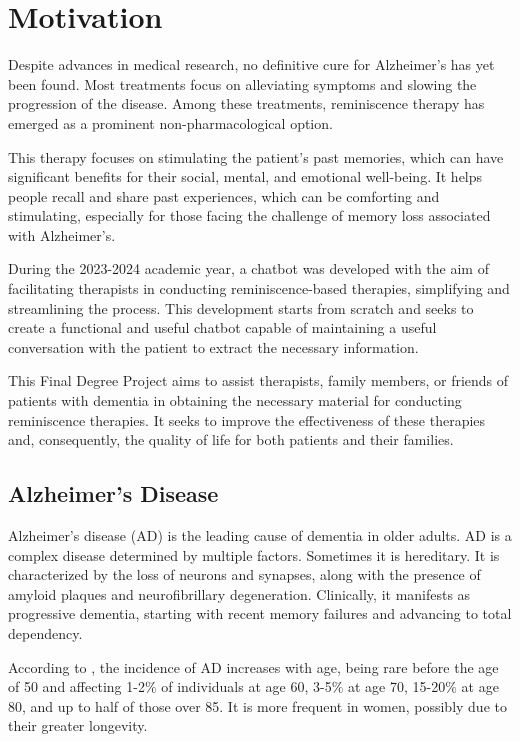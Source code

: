 \section{Motivation}

Despite advances in medical research, no definitive cure for Alzheimer's has yet been found. Most treatments focus on alleviating symptoms and slowing the progression of the disease. Among these treatments, reminiscence therapy has emerged as a prominent non-pharmacological option.

This therapy focuses on stimulating the patient's past memories, which can have significant benefits for their social, mental, and emotional well-being. It helps people recall and share past experiences, which can be comforting and stimulating, especially for those facing the challenge of memory loss associated with Alzheimer's.

During the 2023-2024 academic year, a chatbot was developed with the aim of facilitating therapists in conducting reminiscence-based therapies, simplifying and streamlining the process. This development starts from scratch and seeks to create a functional and useful chatbot capable of maintaining a useful conversation with the patient to extract the necessary information.

This Final Degree Project aims to assist therapists, family members, or friends of patients with dementia in obtaining the necessary material for conducting reminiscence therapies. It seeks to improve the effectiveness of these therapies and, consequently, the quality of life for both patients and their families.

\subsection{Alzheimer's Disease}
Alzheimer's disease (AD) is the leading cause of dementia in older adults. AD is a complex disease determined by multiple factors. Sometimes it is hereditary. It is characterized by the loss of neurons and synapses, along with the presence of amyloid plaques and neurofibrillary degeneration. Clinically, it manifests as progressive dementia, starting with recent memory failures and advancing to total dependency.

According to \cite{Donoso2003}, the incidence of AD increases with age, being rare before the age of 50 and affecting 1-2$\%$ of individuals at age 60, 3-5$\%$ at age 70, 15-20$\%$ at age 80, and up to half of those over 85. It is more frequent in women, possibly due to their greater longevity.

